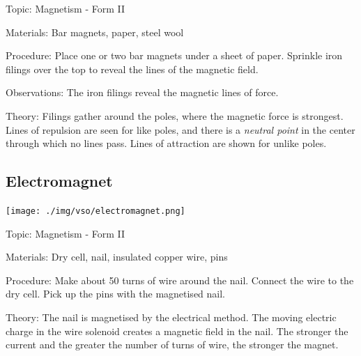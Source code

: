 \begin{multicols}{2}
\begin{description*}
\item[Topic:]{Magnetism - Form II}
\item[Materials:]{Bar magnets, paper, steel wool}
\item[Procedure:]{Place one or two bar magnets under a sheet of paper. Sprinkle iron filings over the top to reveal the lines of the magnetic field.}
\item[Observations:]{The iron filings reveal the magnetic lines of force.}
\item[Theory:]{Filings gather around the poles, where the magnetic force is strongest. Lines of repulsion are seen for like poles, and there is a \emph{neutral point} in the center through which no lines pass. Lines of attraction are shown for unlike poles.}
\end{description*}

\subsection{Electromagnet}

\begin{center}
\texttt{[image: ./img/vso/electromagnet.png]}
\end{center}

\begin{description*}
\item[Topic:]{Magnetism - Form II}
\item[Materials:]{Dry cell, nail, insulated copper wire, pins}
\item[Procedure:]{Make about 50 turns of wire around the nail. Connect the wire to the dry cell. Pick up the pins with the magnetised nail.}
\item[Theory:]{The nail is magnetised by the electrical method. The moving electric charge in the wire solenoid creates a magnetic field in the nail. The stronger the current and the greater the number of turns of wire, the stronger the magnet.}
\end{description*}

\end{multicols}
